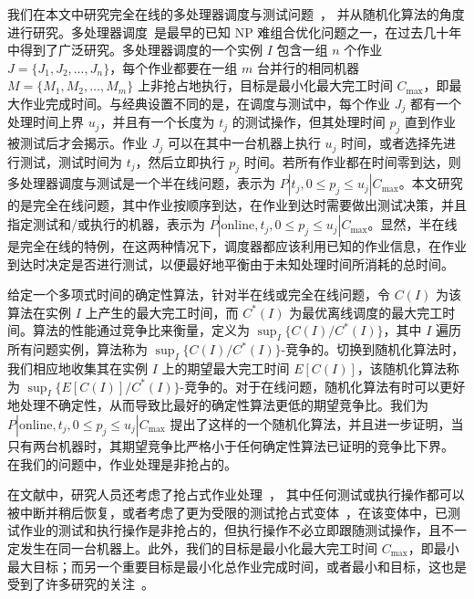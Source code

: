 我们在本文中研究完全在线的多处理器调度与测试问题~\cite{durr2018scheduling,durr2020adversarial,albers2021explorable,albers2021scheduling}，
并从随机化算法的角度进行研究。多处理器调度~\cite{garey1979computers}是最早的已知 NP 难组合优化问题之一，在过去几十年中得到了广泛研究。多处理器调度的一个实例 \( I \) 包含一组 \( n \) 个作业 \( J = \{J_1, J_2, \dots, J_n\} \)，每个作业都要在一组 \( m \) 台并行的相同机器 \( M = \{M_1, M_2, \dots, M_m\} \) 上非抢占地执行，目标是最小化最大完工时间 \( C_{\text{max}} \)，即最大作业完成时间。与经典设置不同的是，在调度与测试中，每个作业 \( J_j \) 都有一个处理时间上界 \( u_j \)，并且有一个长度为 \( t_j \) 的测试操作，但其处理时间 \( p_j \) 直到作业被测试后才会揭示。作业 \( J_j \) 可以在其中一台机器上执行 \( u_j \) 时间，或者选择先进行测试，测试时间为 \( t_j \)，然后立即执行 \( p_j \) 时间。若所有作业都在时间零到达，则多处理器调度与测试是一个半在线问题，表示为 \( P | t_j, 0 \leq p_j \leq u_j | C_{\text{max}} \)。本文研究的是完全在线问题，其中作业按顺序到达，在作业到达时需要做出测试决策，并且指定测试和/或执行的机器，表示为 \( P | \text{online}, t_j, 0 \leq p_j \leq u_j | C_{\text{max}} \)。显然，半在线是完全在线的特例，在这两种情况下，调度器都应该利用已知的作业信息，在作业到达时决定是否进行测试，以便最好地平衡由于未知处理时间所消耗的总时间。

给定一个多项式时间的确定性算法，针对半在线或完全在线问题，令 \( C(I) \) 为该算法在实例 \( I \) 上产生的最大完工时间，而 \( C^*(I) \) 为最优离线调度的最大完工时间。算法的性能通过竞争比来衡量，定义为 \( \sup_I \{ C(I) / C^*(I) \} \)，其中 \( I \) 遍历所有问题实例，算法称为 \( \sup_I \{ C(I) / C^*(I) \} \)-竞争的。切换到随机化算法时，我们相应地收集其在实例 \( I \) 上的期望最大完工时间 \( E[C(I)] \)，该随机化算法称为 \( \sup_I \{ E[C(I)] / C^*(I) \} \)-竞争的。对于在线问题，随机化算法有时可以更好地处理不确定性，从而导致比最好的确定性算法更低的期望竞争比。我们为 \( P | \text{online}, t_j, 0 \leq p_j \leq u_j | C_{\text{max}} \) 提出了这样的一个随机化算法，并且进一步证明，当只有两台机器时，其期望竞争比严格小于任何确定性算法已证明的竞争比下界。
在我们的问题中，作业处理是非抢占的。

在文献中，研究人员还考虑了抢占式作业处理~\cite{durr2018scheduling,durr2020adversarial,albers2021explorable,albers2021scheduling}，
其中任何测试或执行操作都可以被中断并稍后恢复，或者考虑了更为受限的测试抢占式变体~\cite{albers2021scheduling}，在该变体中，已测试作业的测试和执行操作是非抢占的，但执行操作不必立即跟随测试操作，且不一定发生在同一台机器上。此外，我们的目标是最小化最大完工时间 \( C_{\text{max}} \)，即最小最大目标；而另一个重要目标是最小化总作业完成时间，或者最小和目标，这也是受到了许多研究的关注~\cite{durr2018scheduling,durr2020adversarial,albers2021scheduling}。

